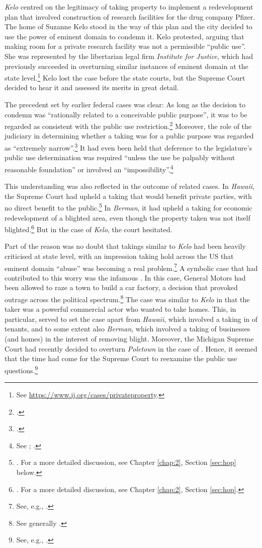 {\it Kelo} centred on the legitimacy of taking property to implement a redevelopment plan that involved construction of research facilities for the drug company Pfizer. The home of Suzanne Kelo stood in the way of this plan and the city decided to use the power of eminent domain to condemn it. Kelo protested, arguing that making room for a private research facility was not a permissible ``public use''. She was represented by the libertarian legal firm {\it Institute for Justice}, which had previously succeeded in overturning similar instances of eminent domain at the state level.\footnote{See \url{https://www.ij.org/cases/privateproperty}.} Kelo lost the case before the state courts, but the Supreme Court decided to hear it and assessed its merits in great detail.

The precedent set by earlier federal cases was clear: As long as the decision to condemn was ``rationally related to a conceivable public purpose'', it was to be regarded as consistent with the public use restriction.\footcite[241]{midkiff84} Moreover, the role of the judiciary in determining whether a taking was for a public purpose was regarded as ``extremely narrow''.\footcite[32]{berman54} It had even been held that deference to the legislature's public use determination was required ``unless the use be palpably without reasonable foundation'' or involved an ``impossibility''.\footnote{See \cite[66]{dominion25}; \cite[680]{gettysburg96}.}

This understanding was also reflected in the outcome of related cases. In {\it Hawaii}, the Supreme Court had upheld a taking that would benefit private parties, with no direct benefit to the public.\footnote{\cite{midkiff84}. For a more detailed discussion, see Chapter \ref{chap:2}, Section \ref{sec:hop} below.} In {\it Berman}, it had upheld a taking for economic redevelopment of a blighted area, even though the property taken was not itself blighted.\footnote{\cite{berman54}. For a more detailed discussion, see Chapter \ref{chap:2}, Section \ref{sec:hop}.} But in the case of {\it Kelo}, the court hesitated.

Part of the reason was no doubt that takings similar to {\it Kelo} had been heavily criticised at state level, with an impression taking hold across the US that eminent domain ``abuse'' was becoming a real problem.\footnote{See, e.g., \cite[667-669]{sandefur05}.} A symbolic case that had contributed to this worry was the infamous \textcite{poletown81}. In this case, General Motors had been allowed to raze a town to build a car factory, a decision that provoked outrage across the political spectrum.\footnote{See generally \cite{sandefur05}.} The case was similar to {\it Kelo} in that the taker was a powerful commercial actor who wanted to take homes. This, in particular, served to set the case apart from {\it Hawaii}, which involved a taking in  of tenants, and to some extent also {\it Berman}, which involved a taking of businesses (and homes) in the interest of removing blight. Moreover, the Michigan Supreme Court had recently decided to overturn {\it Poletown} in the case of \textcite{wayne04}. Hence, it seemed that the time had come for the Supreme Court to reexamine the public use questions.\footnote{See, e.g., \cite{sandefur05,claeys04}.}


